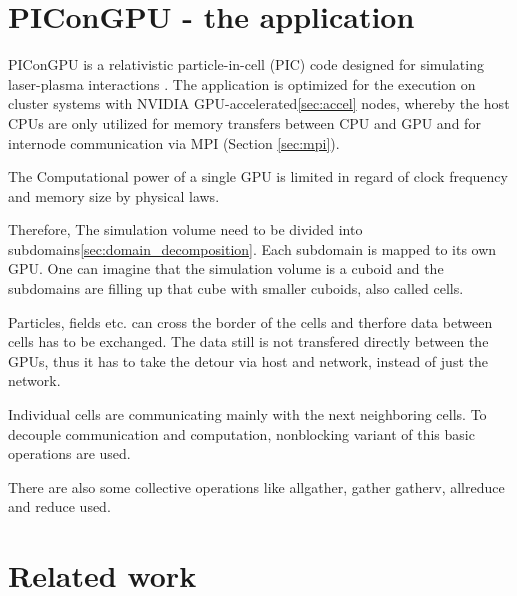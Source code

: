 \section{PIConGPU - the application}
\label{sec:picongpu}
PIConGPU is a relativistic particle-in-cell (PIC) code designed for
simulating laser-plasma interactions \cite{ref:picongpu}. The
application is optimized for the execution on cluster systems with
NVIDIA GPU-accelerated\ref{sec:accel} nodes, whereby the host CPUs are
only utilized for memory transfers between CPU and GPU and for
internode communication via MPI (Section \ref{sec:mpi}).

The Computational power of a single GPU is limited in regard of clock
frequency and memory size by physical laws.

Therefore, The simulation volume need to be divided into
subdomains\ref{sec:domain_decomposition}. Each subdomain is mapped to
its own GPU. One can imagine that the simulation volume is a cuboid
and the subdomains are filling up that cube with smaller cuboids,
also called cells.

Particles, fields etc. can cross the border of the
cells and therfore data between cells has to be
exchanged. The data still is not transfered directly between 
the GPUs, thus it has to take the detour via host and network, instead
of just the network.

Individual cells are communicating mainly with the next
neighboring cells. To decouple communication and computation,
nonblocking variant of this basic operations are used.


There are also some
collective operations like allgather, gather gatherv, allreduce and
reduce used.


\section{Related work}

